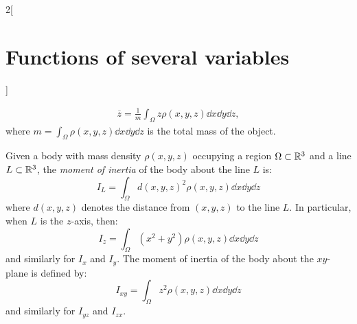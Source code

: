 \documentclass[../../../main_math.tex]{subfiles}
\begin{document}
\begin{multicols}{2}[\section{Functions of several variables}]
\begin{definition}
\begin{gather*}
      \overline{z}=\frac{1}{m}\int_\Omega z\rho(x,y,z)\dd{x}\dd{y}\dd{z},
    \end{gather*}
    where $\displaystyle m=\int_\Omega\rho(x,y,z)\dd{x}\dd{y}\dd{z}$ is the total mass of the object.
  \end{definition}
  \begin{definition}
    Given a body with mass density $\rho(x,y,z)$ occupying a region $\Omega\subset\mathbb{R}^3$ and a line $L\subset\mathbb{R}^3$, the \emph{moment of inertia} of the body about the line $L$ is: $$I_L=\int_\Omega d(x,y,z)^2\rho(x,y,z)\dd{x}\dd{y}\dd{z}$$ where $d(x,y,z)$ denotes the distance from $(x,y,z)$ to the line $L$. In particular, when $L$ is the $z$-axis, then: $$I_z=\int_\Omega (x^2+y^2)\rho(x,y,z)\dd{x}\dd{y}\dd{z}$$ and similarly for $I_x$ and $I_y$. The moment of inertia of the body about the $xy$-plane is defined by: $$I_{xy}=\int_\Omega z^2\rho(x,y,z)\dd{x}\dd{y}\dd{z}$$ and similarly for $I_{yz}$ and $I_{zx}.$
  \end{definition}

\end{multicols}
\end{document}

